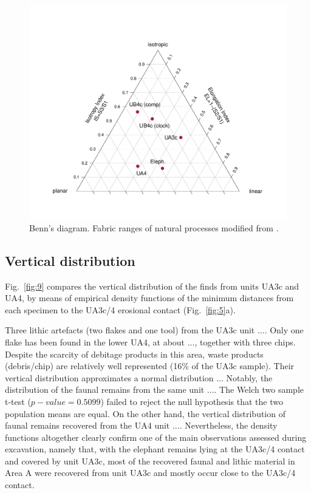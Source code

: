 \documentclass[preprint,authoryear,times]{elsarticle} %
\begin{document}
\begin{figure}[]
  \centering
  \includegraphics[width=.7\textwidth]{../artwork/Fig8.pdf}
  \caption{Benn's diagram. Fabric ranges of natural processes modified from \cite{Bertran1997,Lenoble2004}.}
  \label{fig:8}
\end{figure}

\subsection{Vertical distribution}



Fig.~\ref{fig:9} compares the vertical distribution of the finds from units UA3c and UA4, by means of empirical density functions of the minimum distances from each specimen to the UA3c/4 erosional contact (Fig.~\ref{fig:5}a).

Three lithic artefacts (two flakes and one tool) from the UA3c unit .... Only one flake has been found in the lower UA4, at about ..., together with three chips. Despite the scarcity of debitage products in this area, waste products (debris/chip) are relatively well represented (16\% of the UA3c sample). Their vertical distribution approximates a normal distribution ... Notably, the distribution of the faunal remains from the same unit .... The Welch two sample t-test ($p-value=0.5099$) failed to reject the null hypothesis that the two population means are equal. On the other hand, the vertical distribution of faunal remains recovered from the UA4 unit ....
Nevertheless, the density functions altogether clearly confirm one of the main observations assessed during excavation, namely that, with the elephant remains lying at the UA3c/4 contact and covered by unit UA3c, most of the recovered faunal and lithic material in Area A were recovered from unit UA3c and mostly occur close to the UA3c/4 contact.
\end{document}
